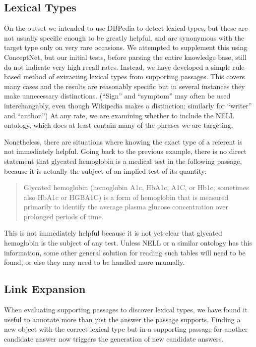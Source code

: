 \documentclass[12pt,letterpaper]{article}
\begin{document}
\subsection{Lexical Types}
On the outset we intended to use DBPedia to detect lexical types, but these are not usually specific enough to be greatly helpful, and are synonymous with the target type only on very rare occasions. We attempted to supplement this using ConceptNet, but our initial tests, before parsing the entire knowledge base, still do not indicate very high recall rates. Instead, we have developed a simple rule-based method of extracting lexical types from supporting passages. This covers many cases and the results are reasonably specific but in several instances they make unnecessary distinctions. (``Sign'' and ``symptom'' may often be used interchangably, even though Wikipedia makes a distinction; similarly for ``writer'' and ``author.'') At any rate, we are examining whether to include the NELL ontology, which does at least contain many of the phrases we are targeting.

Nonetheless, there are situations where knowing the exact type of a referent is not immediately helpful. Going back to the previous example, there is no direct statement that glycated hemoglobin is a medical test in the following passage, because it is actually the subject of an implied test of its quantity:
\begin{quote}
Glycated hemoglobin (hemoglobin A1c, HbA1c, A1C, or Hb1c; sometimes also HbA1c or HGBA1C) is a form of hemoglobin that is measured primarily to identify the average plasma glucose concentration over prolonged periods of time.
\end{quote}
This is not immediately helpful because it is not yet clear that glycated hemoglobin is the subject of any test. Unless NELL or a similar ontology has this information, some other general solution for reading such tables will need to be found, or else they may need to be handled more manually.

\subsection{Link Expansion}
When evaluating supporting passages to discover lexical types, we have found it useful to annotate more than just the answer the passage supports. Finding a new object with the correct lexical type but in a supporting passage for another candidate answer now triggers the generation of new candidate answers.
\end{document}
